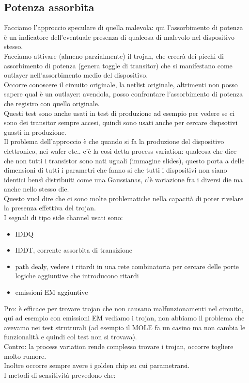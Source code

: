 \documentclass[oneside, 12pt]{extbook}
\begin{document}
\subsection{Potenza assorbita}
Facciamo l'approccio speculare di quella malevola: qui l'assorbimento di potenza è un indicatore dell'eventuale presenza di qualcosa di malevolo nel dispositivo stesso.\\Facciamo attivare (almeno parzialmente) il trojan, che creerà dei picchi di assorbimento di potenza (genera toggle di transitor) che si manifestano come outlayer nell'assorbimento medio del dispositivo.\\Occorre conoscere il circuito originale, la netlist originale, altrimenti non posso sapere qual è un outlayer: avendola, posso confrontare l'assorbimento di potenza che registro con quello originale.\\Questi test sono anche usati in test di produzione ad esempio per vedere se ci sono dei transitor sempre accesi, quindi sono usati anche per cercare dispsotivi guasti in produzione.\\Il problema dell'approccio è che quando si fa la produzione del dispositivo elettronico, nei wafer etc.. c'è la così detta process variation: qualcosa che dice che non tutti i transistor sono nati uguali (immagine slides), questo porta a delle dimensioni di tutti i parametri che fanno si che tutti i dispositivi non siano identici bensì distribuiti come una Gaussianas, c'è variazione fra i diversi die ma anche nello stesso die.\\Questo vuol dire che ci sono molte problematiche nella capacità di poter rivelare la presenza effettiva del trojan.\\I segnali di tipo side channel usati sono:
\begin{itemize}
	\item IDDQ
	\item IDDT, corrente assorbita di transizione
	\item path dealy, vedere i ritardi in una rete combinatoria per cercare delle porte logiche aggiuntive che introducono ritardi
	\item emissioni EM aggiuntive
\end{itemize}
Pro: è efficace per trovare trojan che non causano malfunzionamenti nel circuito, qui ad esempio con emissioni EM vediamo i trojan, non abbiamo il problema che avevamo nei test strutturali (ad esempio il MOLE fa un casino ma non cambia le funzionalità  e quindi col test non si trovava).\\Contro: la process variation rende complesso trovare i trojan, occorre togliere molto rumore.\\Inoltre occorre sempre avere i golden chip su cui parametrarsi.\\I metodi di sensitività prevedono che:
\end{document}
